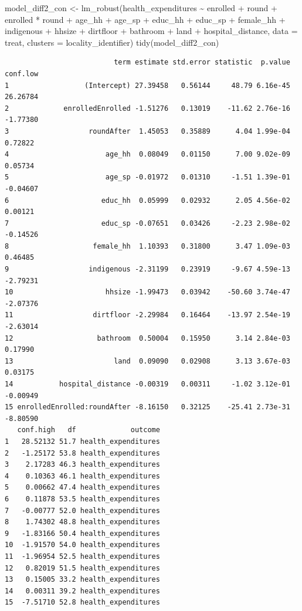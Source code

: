 \documentclass[
  letterpaper,
  DIV=11,
  numbers=noendperiod]{scrartcl}
\newenvironment{Shaded}{\begin{snugshade}}{\end{snugshade}}
\newcommand{\AttributeTok}[1]{\textcolor[rgb]{0.40,0.45,0.13}{#1}}
\newcommand{\FunctionTok}[1]{\textcolor[rgb]{0.28,0.35,0.67}{#1}}
\newcommand{\NormalTok}[1]{\textcolor[rgb]{0.00,0.23,0.31}{#1}}
\newcommand{\OtherTok}[1]{\textcolor[rgb]{0.00,0.23,0.31}{#1}}
\newcommand{\SpecialCharTok}[1]{\textcolor[rgb]{0.37,0.37,0.37}{#1}}
\begin{document}
\begin{Shaded}
\begin{Highlighting}[numbers=left,,]
\NormalTok{model\_diff2\_con }\OtherTok{\textless{}{-}} \FunctionTok{lm\_robust}\NormalTok{(health\_expenditures }\SpecialCharTok{\textasciitilde{}}\NormalTok{ enrolled }\SpecialCharTok{+}\NormalTok{ round }\SpecialCharTok{+}\NormalTok{ enrolled }\SpecialCharTok{*}\NormalTok{ round }\SpecialCharTok{+} 
\NormalTok{                       age\_hh }\SpecialCharTok{+}\NormalTok{ age\_sp }\SpecialCharTok{+}\NormalTok{ educ\_hh }\SpecialCharTok{+}\NormalTok{ educ\_sp }\SpecialCharTok{+}\NormalTok{ female\_hh }\SpecialCharTok{+}\NormalTok{ indigenous }\SpecialCharTok{+} 
\NormalTok{                       hhsize }\SpecialCharTok{+}\NormalTok{ dirtfloor }\SpecialCharTok{+}\NormalTok{ bathroom }\SpecialCharTok{+}\NormalTok{ land }\SpecialCharTok{+}\NormalTok{ hospital\_distance,}
                         \AttributeTok{data =}\NormalTok{ treat,}
                         \AttributeTok{clusters =}\NormalTok{ locality\_identifier)}
\FunctionTok{tidy}\NormalTok{(model\_diff2\_con)}
\end{Highlighting}
\end{Shaded}

\begin{verbatim}
                          term estimate std.error statistic  p.value conf.low
1                  (Intercept) 27.39458   0.56144     48.79 6.16e-45 26.26784
2             enrolledEnrolled -1.51276   0.13019    -11.62 2.76e-16 -1.77380
3                   roundAfter  1.45053   0.35889      4.04 1.99e-04  0.72822
4                       age_hh  0.08049   0.01150      7.00 9.02e-09  0.05734
5                       age_sp -0.01972   0.01310     -1.51 1.39e-01 -0.04607
6                      educ_hh  0.05999   0.02932      2.05 4.56e-02  0.00121
7                      educ_sp -0.07651   0.03426     -2.23 2.98e-02 -0.14526
8                    female_hh  1.10393   0.31800      3.47 1.09e-03  0.46485
9                   indigenous -2.31199   0.23919     -9.67 4.59e-13 -2.79231
10                      hhsize -1.99473   0.03942    -50.60 3.74e-47 -2.07376
11                   dirtfloor -2.29984   0.16464    -13.97 2.54e-19 -2.63014
12                    bathroom  0.50004   0.15950      3.14 2.84e-03  0.17990
13                        land  0.09090   0.02908      3.13 3.67e-03  0.03175
14           hospital_distance -0.00319   0.00311     -1.02 3.12e-01 -0.00949
15 enrolledEnrolled:roundAfter -8.16150   0.32125    -25.41 2.73e-31 -8.80590
   conf.high   df             outcome
1   28.52132 51.7 health_expenditures
2   -1.25172 53.8 health_expenditures
3    2.17283 46.3 health_expenditures
4    0.10363 46.1 health_expenditures
5    0.00662 47.4 health_expenditures
6    0.11878 53.5 health_expenditures
7   -0.00777 52.0 health_expenditures
8    1.74302 48.8 health_expenditures
9   -1.83166 50.4 health_expenditures
10  -1.91570 54.0 health_expenditures
11  -1.96954 52.5 health_expenditures
12   0.82019 51.5 health_expenditures
13   0.15005 33.2 health_expenditures
14   0.00311 39.2 health_expenditures
15  -7.51710 52.8 health_expenditures
\end{verbatim}
\end{document}
